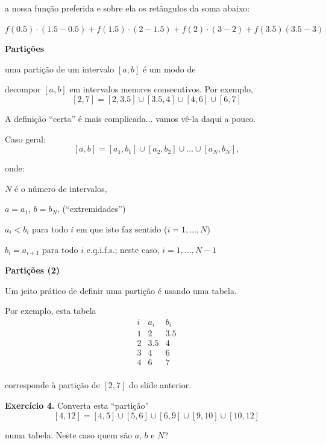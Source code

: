 \documentclass[oneside,12pt]{article}
\begin{document}
a nossa função preferida e sobre ela os retângulos da soma abaixo:

$f(0.5)·(1.5-0.5) + f(1.5)·(2-1.5) + f(2)·(3-2) + f(3.5)(3.5-3)$

\newpage


{\bf Partições}

 uma partição de um intervalo $[a,b]$ é um
modo de

decompor $[a,b]$ em intervalos menores consecutivos. Por exemplo,
%
$$[2,7] = [2,3.5]∪[3.5,4]∪[4,6]∪[6,7]$$

A definição ``certa'' é mais complicada... vamos vê-la daqui a pouco.

Caso geral:
%
$$[a,b] = [a_1,b_1]∪[a_2,b_2]∪\ldots∪[a_N,b_N],$$

onde:

$N$ é o número de intervalos,

$a=a_1$, $b=b_N$, (``extremidades'')

$a_i<b_i$ para todo $i$ em que isto faz sentido ($i=1,\ldots,N$)

$b_i=a_{i+1}$ para todo $i$ e.q.i.f.s.; neste caso, $i=1,\ldots,N-1$

\newpage


{\bf Partições (2)}

Um jeito prático de definir uma partição é usando uma tabela.

Por exemplo, esta tabela
%
$$\begin{array}{ccc}
  i & a_i & b_i \\\hline
  1 & 2 & 3.5 \\
  2 & 3.5 & 4 \\
  3 & 4 & 6 \\
  4 & 6 & 7 \\
  \end{array}
$$

corresponde à partição de $[2,7]$ do slide anterior.

{\bf Exercício 4.} Converta esta ``partição''
%
$$[4,12] = [4,5]∪[5,6]∪[6,9]∪[9,10]∪[10,12]$$

numa tabela. Neste caso quem são $a$, $b$ e $N$?
\end{document}
